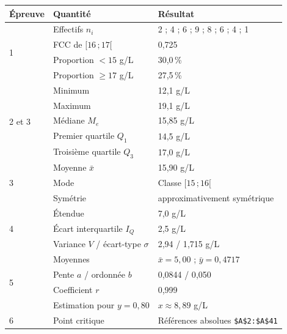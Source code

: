 \documentclass[11pt,a4paper]{article}
\begin{document}
\begin{tcolorbox}[enhanced, colback=corrigelight, colframe=corrige,
                  title={\faListOl\ \ \textbf{Tous les résultats en un coup d'œil}},
                  coltitle=white, fonttitle=\bfseries\large,
                  boxrule=0.8pt, arc=4pt, left=8pt, right=8pt, top=8pt, bottom=8pt,
                  drop fuzzy shadow=black!15]
\small
\renewcommand{\arraystretch}{1.4}
\begin{tabular}{|l|l|l|}
\hline
\rowcolor{corrige!25}
\textbf{Épreuve} & \textbf{Quantité} & \textbf{Résultat} \\
\hline
\multirow{4}{*}{1} & Effectifs $n_i$ & 2 ; 4 ; 6 ; 9 ; 8 ; 6 ; 4 ; 1 \\
\cline{2-3}
 & FCC de $[16\,;17[$ & 0{,}725 \\
\cline{2-3}
 & Proportion $<15$ g/L & 30{,}0\,\% \\
\cline{2-3}
 & Proportion $\ge 17$ g/L & 27{,}5\,\% \\
\hline
\multirow{5}{*}{2 et 3} & Minimum & 12{,}1 g/L \\
\cline{2-3}
 & Maximum & 19{,}1 g/L \\
\cline{2-3}
 & Médiane $M_e$ & 15{,}85 g/L \\
\cline{2-3}
 & Premier quartile $Q_1$ & 14{,}5 g/L \\
\cline{2-3}
 & Troisième quartile $Q_3$ & 17{,}0 g/L \\
\hline
\multirow{3}{*}{3} & Moyenne $\bar{x}$ & 15{,}90 g/L \\
\cline{2-3}
 & Mode & Classe $[15\,;16[$ \\
\cline{2-3}
 & Symétrie & approximativement symétrique \\
\hline
\multirow{3}{*}{4} & Étendue & 7{,}0 g/L \\
\cline{2-3}
 & Écart interquartile $I_Q$ & 2{,}5 g/L \\
\cline{2-3}
 & Variance $V$ / écart-type $\sigma$ & 2{,}94 / 1{,}715 g/L \\
\hline
\multirow{4}{*}{5} & Moyennes & $\bar{x}=5{,}00$ ; $\bar{y}=0{,}4717$ \\
\cline{2-3}
 & Pente $a$ / ordonnée $b$ & 0{,}0844 / 0{,}050 \\
\cline{2-3}
 & Coefficient $r$ & 0{,}999 \\
\cline{2-3}
 & Estimation pour $y=0{,}80$ & $x \approx 8{,}89$ g/L \\
\hline
6 & Point critique & Références absolues \texttt{\$A\$2:\$A\$41} \\
\hline
\end{tabular}
\end{tcolorbox}
\end{document}
